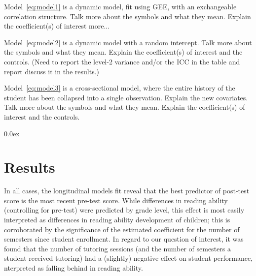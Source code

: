 \documentclass[a0,landscape]{a0poster}
\begin{document}
\begin{multicols}{3}
Model~\ref{eq:model1} is a dynamic model, fit using GEE,
with an exchangeable correlation structure.
{\color{Red}%
Talk more about the symbols and what they mean.
Explain the coefficient(s) of interest more... }

Model~\ref{eq:model2} is a dynamic model with a random intercept.
{\color{Red}%
Talk more about the symbols and what they mean.
Explain the coefficient(s) of interest and the controls.
(Need to report the level-2 variance and/or the ICC in the table
and report discuss it in the results.) }

Model~\ref{eq:model3} is a cross-sectional model, where the
entire history of the student has been collapsed into a
single observation. 
{\color{Red}%
Explain the new covariates.
Talk more about the symbols and what they mean.
Explain the coefficient(s) of interest and the controls. }




\color{NavyBlue}
\parskip 0.0ex
\section*{Results}
%
\color{Black}
\begin{center}\vspace{1cm}

\end{center}\vspace{0.5cm}
\color{NavyBlue}
%   
In all cases, the longitudinal models fit reveal that
the best predictor of post-test score is the most recent
pre-test score.
While differences in reading ability (controlling for pre-test)
were predicted by grade level, this effect is most easily
interpreted as differences in reading ability development
of children; this is corroborated by the significance of the
estimated coefficient for the number of semesters since
student enrollment.
In regard to our question of interest, it was found that the
number of tutoring sessions
(and the number of semesters a student received tutoring)
had a (slightly) negative effect on student performance, 
nterpreted as falling behind in reading ability. 

\color{NavyBlue}


\end{multicols}
\end{document}
